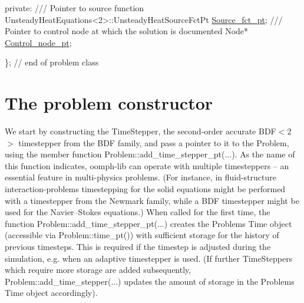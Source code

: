 \begin{DoxyCodeInclude}
\textcolor{keyword}{private}:
\textcolor{comment}{}
\textcolor{comment}{ /// Pointer to source function}
\textcolor{comment}{} UnsteadyHeatEquations<2>::UnsteadyHeatSourceFctPt \hyperlink{classUnsteadyHeatProblem_a923d1a0bd45b1cd747a5b4558ae3f190}{Source\_fct\_pt};
 \textcolor{comment}{}
\textcolor{comment}{ /// Pointer to control node at which the solution is documented}
\textcolor{comment}{} Node* \hyperlink{classUnsteadyHeatProblem_ac0cf04bd0b915f02b171fd50cae13874}{Control\_node\_pt};

\}; \textcolor{comment}{// end of problem class}

\end{DoxyCodeInclude}




 

\hypertarget{index_constructor}{}\section{The problem constructor}\label{index_constructor}
We start by constructing the {\ttfamily Time\+Stepper}, the second-\/order accurate {\ttfamily B\+D\+F$<$2$>$} timestepper from the {\ttfamily B\+DF} family, and pass a pointer to it to the {\ttfamily Problem}, using the member function {\ttfamily Problem\+::add\+\_\+time\+\_\+stepper\+\_\+pt}(...). As the name of this function indicates, {\ttfamily oomph-\/lib} can operate with multiple timesteppers -- an essential feature in multi-\/physics problems. (For instance, in fluid-\/structure interaction-\/problems timestepping for the solid equations might be performed with a timestepper from the {\ttfamily Newmark} family, while a {\ttfamily B\+DF} timestepper might be used for the Navier--Stokes equations.) When called for the first time, the function {\ttfamily Problem\+::add\+\_\+time\+\_\+stepper\+\_\+pt}(...) creates the {\ttfamily Problem\textquotesingle{}s} {\ttfamily Time} object (accessible via {\ttfamily Problem\+::time\+\_\+pt()}) with sufficient storage for the history of previous timesteps. This is required if the timestep is adjusted during the simulation, e.\+g. when an adaptive timestepper is used. (If further {\ttfamily Time\+Steppers} which require more storage are added subsequently, {\ttfamily Problem\+::add\+\_\+time\+\_\+stepper}(...) updates the amount of storage in the {\ttfamily Problem\textquotesingle{}s} {\ttfamily Time} object accordingly).

